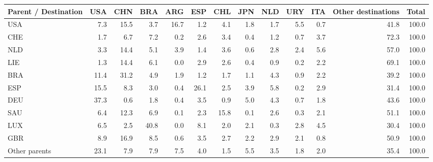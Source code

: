 \begin{tabular}{lrrrrrrrrrrrr}
\toprule
Parent / Destination & USA & CHN & BRA & ARG & ESP & CHL & JPN & NLD & URY & ITA & Other destinations & Total \\
\midrule
USA & 7.3 & 15.5 & 3.7 & 16.7 & 1.2 & 4.1 & 1.8 & 1.7 & 5.5 & 0.7 & 41.8 & 100.0 \\
CHE & 1.7 & 6.7 & 7.2 & 0.2 & 2.6 & 3.4 & 0.4 & 1.2 & 0.7 & 3.7 & 72.3 & 100.0 \\
NLD & 3.3 & 14.4 & 5.1 & 3.9 & 1.4 & 3.6 & 0.6 & 2.8 & 2.4 & 5.6 & 57.0 & 100.0 \\
LIE & 1.3 & 14.4 & 6.1 & 0.0 & 2.9 & 2.6 & 0.4 & 0.9 & 0.2 & 2.2 & 69.1 & 100.0 \\
BRA & 11.4 & 31.2 & 4.9 & 1.9 & 1.2 & 1.7 & 1.1 & 4.3 & 0.9 & 2.2 & 39.2 & 100.0 \\
ESP & 15.5 & 8.3 & 3.0 & 0.4 & 26.1 & 2.5 & 3.9 & 5.8 & 0.2 & 2.9 & 31.4 & 100.0 \\
DEU & 37.3 & 0.6 & 1.8 & 0.4 & 3.5 & 0.9 & 5.0 & 4.3 & 0.7 & 1.8 & 43.6 & 100.0 \\
SAU & 6.4 & 12.3 & 6.9 & 0.1 & 2.3 & 15.8 & 0.1 & 2.6 & 0.3 & 2.1 & 51.1 & 100.0 \\
LUX & 6.5 & 2.5 & 40.8 & 0.0 & 8.1 & 2.0 & 2.1 & 0.3 & 2.8 & 4.5 & 30.4 & 100.0 \\
GBR & 8.9 & 16.9 & 8.5 & 0.6 & 3.5 & 2.7 & 2.2 & 2.9 & 2.1 & 0.8 & 50.9 & 100.0 \\
Other parents & 23.1 & 7.9 & 7.9 & 7.5 & 4.0 & 1.5 & 5.5 & 3.5 & 1.8 & 2.0 & 35.4 & 100.0 \\
\bottomrule
\end{tabular}
